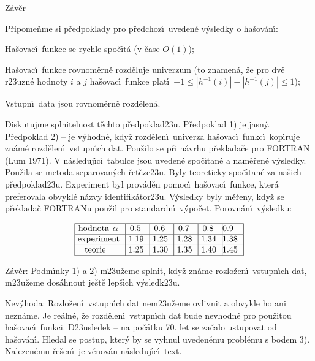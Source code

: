 \subhead
Z\'av\v er
\endsubhead
\smallskip

\flushpar P\v ripome\v nme si p\v redpoklady pro p\v redchoz\'\i\ uveden\'e 
v\'ysledky o ha\v sov\'an\'\i :
\roster
\item
Ha\v sovac\'\i\ funkce se rychle spo\v c\'\i t\'a (v \v case 
$O(1)$);
\item Ha\v sovac\'\i\ funkce rovnom\v ern\v e rozd\v eluje univerzum (to 
znamen\'a, \v ze pro dv\v e r\accent23uzn\'e hodnoty $i$ a $j$ 
ha\v sovac\'\i\ funkce plat\'\i\ $-1\le |h^{-1}(i)|-|h^{-1}(j)|\le 
1$); 
\item 
Vstupn\'\i\ data jsou rovnom\v ern\v e rozd\v elen\'a.
\endroster

\flushpar Diskutujme splnitelnost t\v echto p\v redpoklad\accent23u.\newline
P\v redpoklad 1) je jasn\'y.\newline 
P\v redpoklad 2) -- je v\'yhodn\'e, 
kdy\v z rozd\v elen\'\i\ univerza ha\v sovac\'\i\ funkc\'\i\ kop\'\i ruje zn\'am\'e 
rozd\v ele\-n\'\i\ vstupn\'\i ch dat. Pou\v zilo se p\v ri n\'avrhu 
p\v reklada\v ce pro FORTRAN (Lum 1971). V n\'asle\-du\-j\'\i\-c\'\i\ tabulce jsou uveden\'e spo\v c\'\i tan\'e a nam\v e\v ren\'e v\'ysledky. Pou\v zila se metoda separovan\'ych \v ret\v ezc\accent23u. Byly teoreticky 
spo\v c\'\i tan\'e za na\v sich p\v redpoklad\accent23u. Experiment byl 
prov\'ad\v en pomoc\'\i\ ha\v sovac\'\i\ funkce, kter\'a preferovala 
obvykl\'e n\'azvy identifik\'ator\accent23u. V\'ysledky byly m\v e\v reny, 
kdy\v z se p\v reklada\v c FORTRANu pou\v zil pro standardn\'\i\ v\'ypo\v cet.
Porovn\'an\'\i\ v\'ysledku:

$$\vtop{\offinterlineskip\halign {\strut\vrule\ # & \vrule\ # & \vrule\ # & \vrule\ # & \vrule\ # & \vrule \hfil # \hfil \vrule\cr\noalign{\hrule}hodnota $\alpha$ & 0.5 & 0.6 & 0.7 & 0.8 & 0.9 \hfill \cr\noalign{\hrule}experiment & 1.19 & 1.25 & 1.28 & 1.34 & 1.38 \cr\noalign{\hrule}teorie & 1.25 & 1.30 & 1.35 & 1.40 & 1.45 \cr\noalign{\hrule}}}$$
\medskip

\flushpar Z\'av\v er: Podm\'\i nky 1) a 2) m\accent23u\v zeme splnit, 
kdy\v z zn\'ame rozlo\v zen\'\i\ vstupn\'\i ch dat, m\accent23u\v zeme 
dos\'ahnout je\v st\v e lep\v s\'\i ch v\'ysledk\accent23u.
\medskip

\flushpar Nev\'yhoda: Rozlo\v zen\'\i\ vstupn\'\i ch dat 
nem\accent23u\v zeme ovlivnit a obvykle ho ani nezn\'ame. Je 
re\'aln\'e, \v ze rozd\v elen\'\i\ vstupn\'\i ch dat bude nevhodn\'e pro 
pou\v zitou ha\v sovac\'\i\ funkci. D\accent23usledek -- na po\v c\'atku 
70. let se za\v calo ustupovat od ha\v sov\'an\'\i . Hledal se postup, 
kter\'y by se vyhnul uveden\'emu probl\'emu s bodem 3). Nalezen\'emu 
\v re\v sen\'\i\ je v\v enov\'an n\'asleduj\'\i c\'\i\ text.
\medskip



